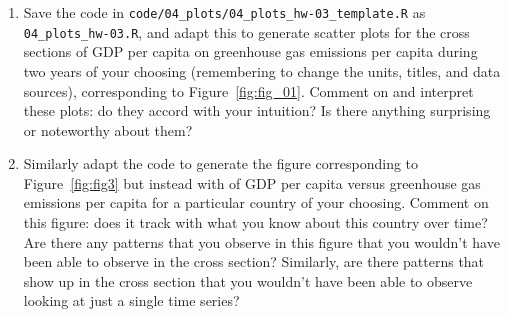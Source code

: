 \begin{enumerate}
    \item Save the code in \verb+code/04_plots/04_plots_hw-03_template.R+ as \verb+04_plots_hw-03.R+, and adapt this to generate scatter plots for the cross sections of GDP per capita on greenhouse gas emissions per capita during two years of your choosing (remembering to change the units, titles, and data sources), corresponding to Figure~\ref{fig:fig_01}. Comment on and interpret these plots: do they accord with your intuition? Is there anything surprising or noteworthy about them? 
    \item Similarly adapt the code to generate the figure corresponding to Figure~\ref{fig:fig3} but instead with of GDP per capita versus greenhouse gas emissions per capita for a particular country of your choosing. Comment on this figure: does it track with what you know about this country over time? Are there any patterns that you observe in this figure that you wouldn't have been able to observe in the cross section? Similarly, are there patterns that show up in the cross section that you wouldn't have been able to observe looking at just a single time series?
\end{enumerate}


